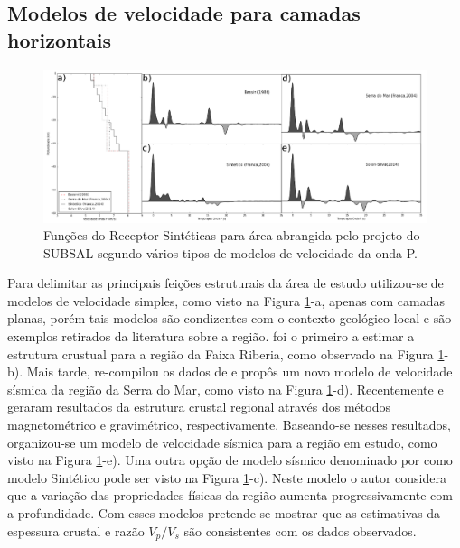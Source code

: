 \subsection{Modelos de velocidade para camadas horizontais}

\begin{figure}[!ht]
\centering
\includegraphics[scale=0.22]{Figs/modelagem_RF.png}
\caption{Funções do Receptor Sintéticas para área abrangida pelo projeto do SUBSAL segundo vários tipos de modelos de velocidade da onda P.}
\label{modelagem}
\end{figure}

Para delimitar as principais feições estruturais da área de estudo utilizou-se de modelos de velocidade simples, como visto na Figura \ref{modelagem}-a, apenas com camadas planas, porém tais modelos são condizentes com o contexto geológico local e são exemplos retirados da literatura sobre a região. \cite{Bassini_1986} foi o primeiro a estimar a estrutura crustual para a região da Faixa Riberia, como observado na Figura \ref{modelagem}-b). Mais tarde, \cite{sand_franca_crustal_2004} re-compilou os dados de \cite{Bassini_1986} e propôs um novo modelo de velocidade sísmica da região da Serra do Mar, como visto na Figura \ref{modelagem}-d). Recentemente \cite{flora_solon_ancient_2013} e \cite{Silva_2014} geraram resultados da estrutura crustal regional através dos métodos magnetométrico e gravimétrico, respectivamente. Baseando-se nesses resultados, organizou-se um modelo de velocidade sísmica para a região em estudo, como visto na Figura \ref{modelagem}-e). Uma outra opção de modelo sísmico denominado por \cite{sand_franca_crustal_2004} como modelo Sintético pode ser visto na Figura \ref{modelagem}-c). Neste modelo o autor considera que a variação das propriedades físicas da região aumenta progressivamente com a profundidade. Com esses modelos pretende-se mostrar que as estimativas da espessura crustal e razão $V_{p}/V_{s}$ são consistentes com os dados observados.

